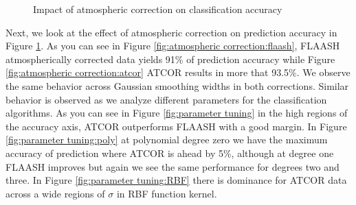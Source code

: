 \documentclass[remotesensing,article,accept,moreauthors,pdftex,12pt,a4paper]{mdpi}
\begin{document}
\begin{figure}[t]
  \centering
  \hspace{1em}%
   \caption{Impact of atmospheric correction on classification accuracy}
 \label{fig:atmospheric correction}
\end{figure}

Next, we look at the effect of atmospheric correction on prediction accuracy in Figure \ref{fig:atmospheric correction}. As you can see in Figure \ref{fig:atmospheric correction:flaash}, FLAASH atmospherically corrected data yields 91\% of prediction accuracy while Figure \ref{fig:atmospheric correction:atcor} ATCOR results in more that 93.5\%. We observe the same behavior across Gaussian smoothing widths in both corrections. Similar behavior is observed as we analyze different parameters for the classification algorithms. As you can see in Figure \ref{fig:parameter tuning} in the high regions of the accuracy axis, ATCOR outperforms FLAASH with a good margin. In Figure \ref{fig:parameter tuning:poly} at polynomial degree zero we have the maximum accuracy of prediction where ATCOR is ahead by 5\%, although at degree one FLAASH improves but again we see the same performance for degrees two and three. In Figure \ref{fig:parameter tuning:RBF} there is dominance for ATCOR data across a wide regions of $\sigma$ in RBF function kernel.
\end{document}
